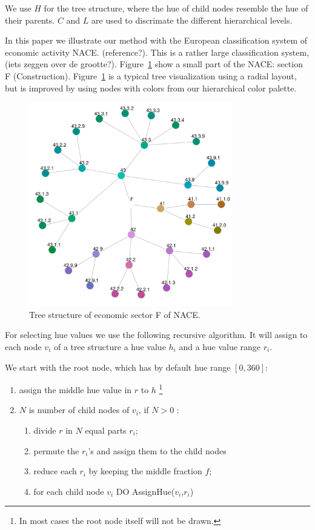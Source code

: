 \documentclass[review]{vgtc}                 %
\begin{document}
We use $H$ for the tree structure, where the hue of child nodes resemble the hue of their parents. $C$ and $L$ are used to discrimate the different hierarchical levels.

In this paper we illustrate our method with the European classification system of economic activity NACE. (reference?). This is a rather large classification system, (iets zeggen over de grootte?). Figure~\ref{fig:sbiF} show a small part of the NACE: section F (Construction). Figure~\ref{fig:sbiF} is a typical tree visualization using a radial layout, but is improved by using nodes with colors from our hierarchical color palette. 

\begin{figure}[htb]
  \centering
  \includegraphics[width=3.5in]{sbi_F.pdf}
  \caption{Tree structure of economic sector F of NACE.}\label{fig:sbiF}
\end{figure}

For selecting hue values we use the following recursive algorithm. It will assign to each node $v_i$ of a tree structure a hue value $h_i$ and a hue value range $r_i$.

We start with the root node, which has by default hue range $[0, 360]$:

\begin{enumerate} \itemsep1pt \parskip0pt 
\item assign the middle hue value in $r$ to $h$ \footnote{In most cases the root node itself will not be drawn.}
\item $N$ is number of child nodes of $v_i$, if $N>0$ :
\begin{enumerate}[i] \itemsep1pt \parskip0pt 
\item divide $r$ in $N$ equal parts $r_i$;
\item permute the $r_i$'s and assign them to the child nodes
\item reduce each $r_i$ by keeping the middle fraction $f$;
\item for each child node $v_i$ DO AssignHue($v_i$,$r_i$)
\end{enumerate}
\end{enumerate}
\end{document}
